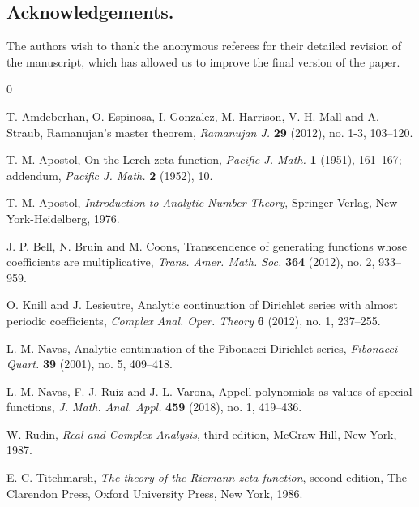 \documentclass[11pt,a4paper]{amsart}
\theoremstyle{plain}
\theoremstyle{plain}
\theoremstyle{plain}
\theoremstyle{definition}
\theoremstyle{remark}
\begin{document}
\subsection*{Acknowledgements.}
The authors wish to thank the anonymous referees for their detailed revision of the manuscript,
which has allowed us to improve the final version of the paper.

\begin{thebibliography}{0}

T. Amdeberhan, O. Espinosa, I. Gonzalez, M. Harrison, V. H. Mall and A. Straub,
{Ramanujan's master theorem},
\textit{Ramanujan J.}
\textbf{29} (2012), no. 1-3, 103--120.

T. M. Apostol,
{On the Lerch zeta function},
\textit{Pacific J. Math.} \textbf{1} (1951), 161--167;
addendum, \textit{Pacific J. Math.} \textbf{2} (1952), 10.

T. M. Apostol,
\textit{Introduction to Analytic Number Theory}, 
Springer-Verlag, New York-Heidelberg, 1976.

J. P. Bell, N. Bruin and M. Coons,
{Transcendence of generating functions whose coefficients are multiplicative},
\textit{Trans. Amer. Math. Soc.}
\textbf{364} (2012), no. 2, 933--959.

O. Knill and J. Lesieutre,
{Analytic continuation of Dirichlet series with almost periodic coefficients},
\textit{Complex Anal. Oper. Theory} \textbf{6} (2012), no. 1, 237--255.

L. M. Navas,
{Analytic continuation of the Fibonacci Dirichlet series},
\textit{Fibonacci Quart.} \textbf{39} (2001), no. 5, 409--418.

L. M. Navas, F. J. Ruiz and J. L. Varona,
{Appell polynomials as values of special functions},
\textit{J. Math. Anal. Appl.} \textbf{459} (2018), no. 1, 419--436.

W. Rudin,
\textit{Real and Complex Analysis},
third edition, McGraw-Hill, New York, 1987.

E. C. Titchmarsh, 
\textit{The theory of the Riemann zeta-function}, second edition,
The Clarendon Press, Oxford University Press, New York, 1986.

\end{thebibliography}

\end{document}
